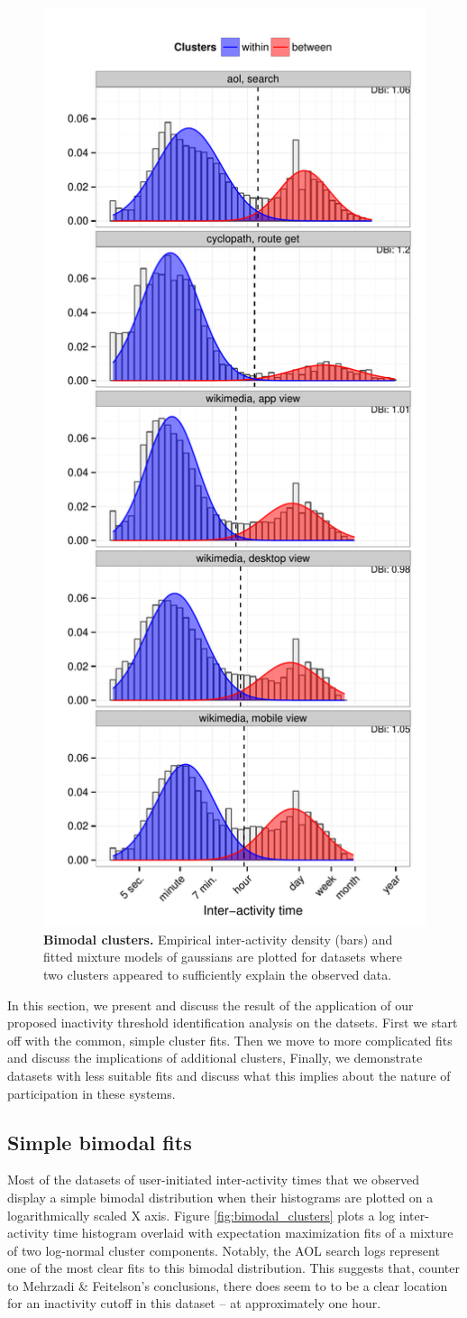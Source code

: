 \begin{figure}
\centering
\includegraphics[width=.45\textwidth]{figures/bimodal_clusters.pdf}
\caption{
    \textbf{Bimodal clusters.} Empirical inter-activity density (bars) and fitted mixture models of gaussians are plotted for datasets where two clusters appeared to sufficiently explain the observed data.
}
\end{figure}
In this section, we present and discuss the result of the application of our proposed inactivity threshold identification analysis on the datsets.  First we start off with the common, simple cluster fits.  Then we move to more complicated fits and discuss the implications of additional clusters,  Finally, we demonstrate datasets with less suitable fits and discuss what this implies about the nature of participation in these systems.

\subsection{Simple bimodal fits}
Most of the datasets of user-initiated inter-activity times that we observed display a simple bimodal distribution when their histograms are plotted on a logarithmically scaled X axis.  Figure \ref{fig:bimodal_clusters} plots a log inter-activity time histogram overlaid with expectation maximization fits of a mixture of two log-normal cluster components.  Notably, the AOL search logs represent one of the most clear fits to this bimodal distribution.  This suggests that, counter to Mehrzadi
\& Feitelson's conclusions\cite{mehrzadi2012onextracting}, there does seem to to be a clear location for an inactivity cutoff in this dataset -- at approximately one hour.

